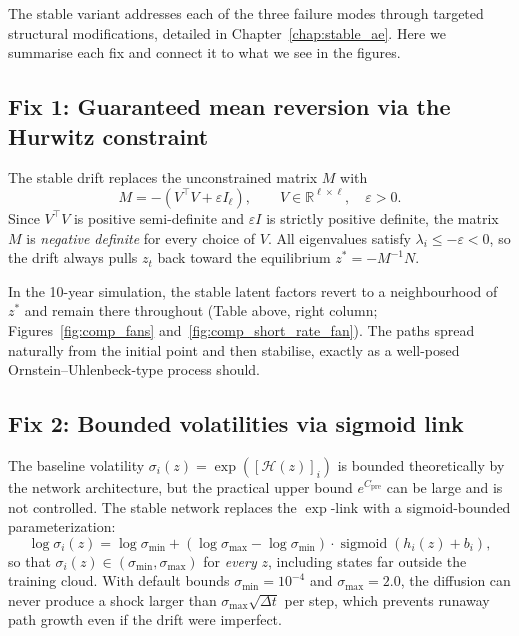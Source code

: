 The stable variant addresses each of the three failure modes through targeted
structural modifications, detailed in Chapter~\ref{chap:stable_ae}.
Here we summarise each fix and connect it to what we see in the figures.

\subsection{Fix 1: Guaranteed mean reversion via the Hurwitz constraint}
\label{subsec:fix_hurwitz}

The stable drift replaces the unconstrained matrix $M$ with
\[
    M = -\!\left(V^\top V + \varepsilon I_\ell\right), \qquad
    V \in \mathbb{R}^{\ell \times \ell}, \quad \varepsilon > 0.
\]
Since $V^\top V$ is positive semi-definite and $\varepsilon I$ is strictly positive
definite, the matrix $M$ is \emph{negative definite} for every choice of $V$.
All eigenvalues satisfy $\lambda_i \leq -\varepsilon < 0$, so the drift always
pulls $z_t$ back toward the equilibrium $z^* = -M^{-1}N$.

In the 10-year simulation, the stable latent factors revert to a neighbourhood
of $z^*$ and remain there throughout (Table above, right column;
Figures~\ref{fig:comp_fans} and~\ref{fig:comp_short_rate_fan}).
The paths spread naturally from the initial point and then stabilise,
exactly as a well-posed Ornstein--Uhlenbeck-type process should.

\subsection{Fix 2: Bounded volatilities via sigmoid link}
\label{subsec:fix_sigma}

The baseline volatility $\sigma_i(z) = \exp([\mathcal{H}(z)]_i)$ is bounded
theoretically by the network architecture, but the practical upper bound
$e^{C_{\mathrm{pre}}}$ can be large and is not controlled.
The stable network replaces the $\exp$-link with a sigmoid-bounded parameterization:
\[
    \log\sigma_i(z) = \log\sigma_{\min}
        + (\log\sigma_{\max} - \log\sigma_{\min})\cdot
          \operatorname{sigmoid}(h_i(z) + b_i),
\]
so that $\sigma_i(z) \in (\sigma_{\min}, \sigma_{\max})$ for \emph{every} $z$,
including states far outside the training cloud.
With default bounds $\sigma_{\min} = 10^{-4}$ and $\sigma_{\max} = 2.0$,
the diffusion can never produce a shock larger than $\sigma_{\max}\sqrt{\Delta t}$
per step, which prevents runaway path growth even if the drift were imperfect.

